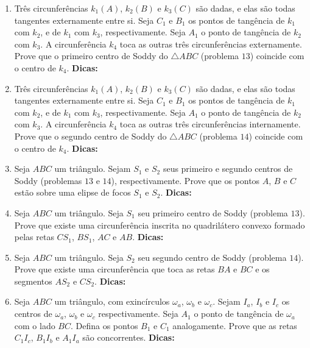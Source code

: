 \documentclass{article}
\newcommand{\dica}{\textbf{Dicas:}}
\newcommand{\iniTri}{Seja $ABC$ um triângulo}
\begin{document}
\begin{multicols}{2}
\begin{enumerate}
    \item Três circunferências $k_1(A)$, $k_2(B)$ e $k_3(C)$ são dadas, e elas são todas tangentes externamente entre si. Seja $C_1$ e $B_1$ os pontos de tangência de $k_1$ com $k_2$, e de $k_1$ com $k_3$, respectivamente. Seja $A_1$ o ponto de tangência de $k_2$ com $k_3$. A circunferência $k_4$ toca as outras três circunferências externamente. Prove que o primeiro centro de Soddy do $\triangle ABC$ (problema $13$) coincide com o centro de $k_4$. \dica %
    
    \item Três circunferências $k_1(A)$, $k_2(B)$ e $k_3(C)$ são dadas, e elas são todas tangentes externamente entre si. Seja $C_1$ e $B_1$ os pontos de tangência de $k_1$ com $k_2$, e de $k_1$ com $k_3$, respectivamente. Seja $A_1$ o ponto de tangência de $k_2$ com $k_3$. A circunferência $k_4$ toca as outras três circunferências internamente. Prove que o segundo centro de Soddy do $\triangle ABC$ (problema $14$) coincide com o centro de $k_4$. \dica %
    
    \item \iniTri. Sejam $S_1$ e $S_2$ seus primeiro e segundo centros de Soddy (problemas $13$ e $14$), respectivamente. Prove que os pontos $A$, $B$ e $C$ estão sobre uma elipse de focos $S_1$ e $S_2$. \dica %
    
    \item \iniTri. Seja $S_1$ seu primeiro centro de Soddy (problema $13$). Prove que existe uma circunferência inscrita no quadrilátero convexo formado pelas retas $CS_1$, $BS_1$, $AC$ e $AB$. \dica %
    
    \item \iniTri. Seja $S_2$ seu segundo centro de Soddy (problema $14$). Prove que existe uma circunferência que toca as retas $BA$ e $BC$ e os segmentos $AS_2$ e $CS_2$. \dica %
    
    \item \iniTri, com exincírculos $\omega_a$, $\omega_b$ e $\omega_c$. Sejam $I_a$, $I_b$ e $I_c$ os centros de $\omega_a$, $\omega_b$ e $\omega_c$ respectivamente. Seja $A_1$ o ponto de tangência de $\omega_a$ com o lado $BC$. Defina os pontos $B_1$ e $C_1$ analogamente. Prove que as retas $C_1I_c$, $B_1I_b$ e $A_1I_a$ são concorrentes. \dica %
    

\end{enumerate}
\end{multicols}
\end{document}
